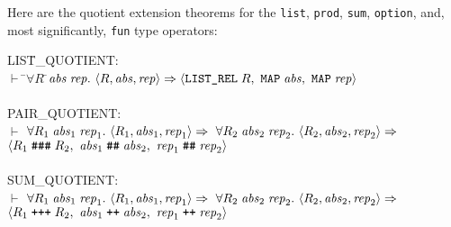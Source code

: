 \documentclass[envcountsame,runningheads]{llncs}
\begin{document}
Here are the quotient extension theorems for the {\tt list}, {\tt prod},
{\tt sum}, {\tt option}, and, most significantly, {\tt fun} type operators:

{\tt \begin{tabbing}
LIS\=T\_QUOTIENT: \\
\>  $\vdash$ \=$\forall R\;$\=${\it abs}\;{\it rep}.\ 
          \langle R,{\it abs},{\it rep} \rangle \Rightarrow 
          \langle \mbox{\tt LIST\_REL}\;R,\ 
            \mbox{\tt MAP}\;{\it abs},\ \mbox{\tt MAP}\;{\it rep} \rangle$ \\
\\
PAIR\_QUOTIENT: \\
\>  $\vdash$   $\forall R_1\;{\it abs}_1\;{\it rep}_1.\ 
          \langle R_1,{\it abs}_1,{\it rep}_1 \rangle \Rightarrow \ 
          \forall R_2\;{\it abs}_2\;{\it rep}_2.\ 
          \langle R_2,{\it abs}_2,{\it rep}_2 \rangle \Rightarrow $ \\
\>\>\>   $\langle R_1\;\mbox{\tt \#\#\#}\;R_2,\ 
            {\it abs}_1\;\mbox{\tt \#\#}\;{\it abs}_2,\ 
            {\it rep}_1\;\mbox{\tt \#\#}\;{\it rep}_2
          \rangle$ \\
\\
SUM\_QUOTIENT: \\
\>  $\vdash$   $\forall R_1\;{\it abs}_1\;{\it rep}_1.\ 
          \langle R_1,{\it abs}_1,{\it rep}_1 \rangle \Rightarrow \ 
          \forall R_2\;{\it abs}_2\;{\it rep}_2.\ 
          \langle R_2,{\it abs}_2,{\it rep}_2 \rangle \Rightarrow $ \\
\>\>\>   $\langle R_1\;\mbox{\tt +++}\;R_2,\ 
            {\it abs}_1\;\mbox{\tt ++}\;{\it abs}_2,\ 
            {\it rep}_1\;\mbox{\tt ++}\;{\it rep}_2
          \rangle$ \\

\end{tabbing}}
\end{document}
